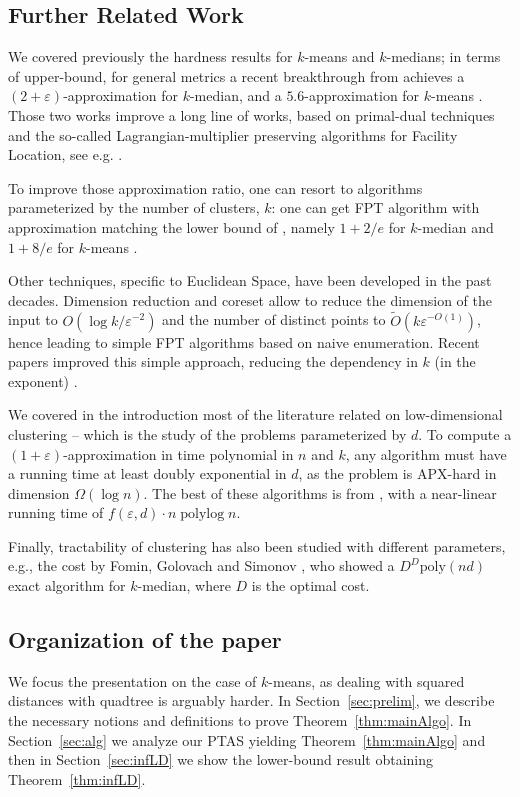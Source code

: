 \documentclass[11pt]{article}
\newcommand{\eps}{\varepsilon}
\renewcommand{\tilde}{\widetilde}
\begin{document}
\subsection{Further Related Work}\label{app:relatedWork}

We covered previously the hardness results for $k$-means and $k$-medians; in terms of upper-bound, for general metrics a recent breakthrough from \cite{Cohen-Addad0LSS25} achieves a $(2+\eps)$-approximation for $k$-median, and a $5.6$-approximation for $k$-means \cite{kmeans}. Those two works improve a long line of works, based on primal-dual techniques and the so-called Lagrangian-multiplier preserving algorithms for Facility Location, see e.g. \cite{JainV01, JMS02, LiS16}. 

To improve those approximation ratio, one can resort to algorithms parameterized by the number of clusters, $k$: one can get FPT algorithm with approximation matching the lower bound of \cite{JMS02}, namely $1+2/e$ for $k$-median and $1+8/e$ for $k$-means \cite{Cohen-AddadG0LL19}. 

Other techniques, specific to Euclidean Space, have been developed in the past decades. Dimension reduction \cite{MakarychevMR19} and coreset \cite{Cohen-AddadSS21} allow to reduce the dimension of the input to $O(\log k / \eps^{-2})$ and the number of distinct points to $\tilde{O}(k \eps^{-O(1)})$, hence leading to simple FPT algorithms based on naive enumeration.
Recent papers improved this simple approach, reducing the dependency in $k$ (in the exponent) \cite{AbbasiBBCGKMSS23}. 

We covered in the introduction most of the literature related on low-dimensional clustering -- which is the study of the problems parameterized by $d$. To compute a $(1+\eps)$-approximation in time polynomial in $n$ and $k$, any algorithm must have a running time at least doubly exponential in $d$, as the problem is APX-hard in dimension $\Omega(\log n)$. The best of these algorithms is from \cite{jacm}, with a near-linear running time of $f(\eps, d)\cdot  n \operatorname{polylog} n$. 

Finally, tractability of clustering has also been studied with different parameters, e.g., the cost by Fomin, Golovach and Simonov \cite{FominGS21}, who showed a $D^D \mathrm{poly}(nd)$ exact algorithm for $k$-median, where $D$ is the optimal cost. 

\subsection{Organization of the paper}
We focus the presentation on the case of $k$-means, as dealing with squared distances with quadtree is arguably harder. In Section~\ref{sec:prelim}, we describe the necessary notions and definitions to prove Theorem~\ref{thm:mainAlgo}. In Section~\ref{sec:alg} we analyze our PTAS yielding Theorem~\ref{thm:mainAlgo} and then in Section~\ref{sec:infLD} we show the lower-bound result obtaining Theorem~\ref{thm:infLD}.
\end{document}
